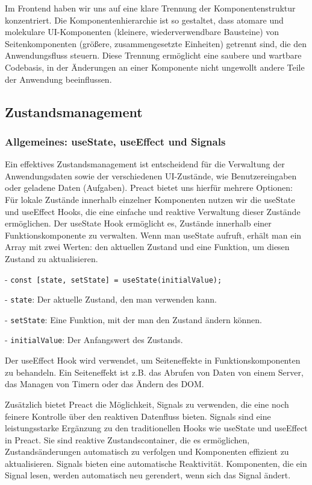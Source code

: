 \documentclass[12pt,a4paper]{article} %
\begin{document}
Im Frontend haben wir uns auf eine klare Trennung der Komponentenstruktur konzentriert. Die Komponentenhierarchie ist so gestaltet, dass atomare und molekulare UI-Komponenten (kleinere, wiederverwendbare Bausteine) von Seitenkomponenten (größere, zusammengesetzte Einheiten) getrennt sind, die den Anwendungsfluss steuern. Diese Trennung ermöglicht eine saubere und wartbare Codebasis, in der Änderungen an einer Komponente nicht ungewollt andere Teile der Anwendung beeinflussen.

\subsection{Zustandsmanagement}

\subsubsection{Allgemeines: useState, useEffect und Signals}

Ein effektives Zustandsmanagement ist entscheidend für die Verwaltung der Anwendungsdaten sowie der verschiedenen UI-Zustände, wie Benutzereingaben oder geladene Daten (Aufgaben). Preact bietet uns hierfür mehrere Optionen: Für lokale Zustände innerhalb einzelner Komponenten nutzen wir die useState und useEffect Hooks, die eine einfache und reaktive Verwaltung dieser Zustände ermöglichen. 
Der useState Hook ermöglicht es, Zustände innerhalb einer Funktionskomponente zu verwalten. Wenn man useState aufruft, erhält man ein Array mit zwei Werten: den aktuellen Zustand und eine Funktion, um diesen Zustand zu aktualisieren.

- \texttt{const [state, setState] = useState(initialValue);}

- \texttt{state}: Der aktuelle Zustand, den man verwenden kann.

- \texttt{setState}: Eine Funktion, mit der man den Zustand ändern können.

- \texttt{initialValue}: Der Anfangswert des Zustands.

Der useEffect Hook wird verwendet, um Seiteneffekte in Funktionskomponenten zu behandeln. Ein Seiteneffekt ist z.B. das Abrufen von Daten von einem Server, das Managen von Timern oder das Ändern des DOM.

Zusätzlich bietet Preact die Möglichkeit, Signals zu verwenden, die eine noch feinere Kontrolle über den reaktiven Datenfluss bieten.
Signals sind eine leistungsstarke Ergänzung zu den traditionellen Hooks wie useState und useEffect in Preact. Sie sind reaktive Zustandscontainer, die es ermöglichen, Zustandsänderungen automatisch zu verfolgen und Komponenten effizient zu aktualisieren. Signals bieten eine automatische Reaktivität. Komponenten, die ein Signal lesen, werden automatisch neu gerendert, wenn sich das Signal ändert.
\end{document}
